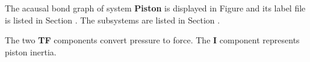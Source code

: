 

   The acausal bond graph of system \textbf{Piston} is
   displayed in Figure  and its label
   file is listed in Section .
   The subsystems are listed in Section .

The two {\bf TF} components convert pressure to force. The {\bf I}
component represents piston inertia.

